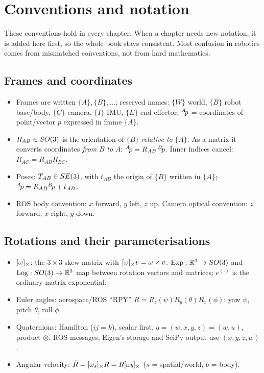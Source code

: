 \documentclass[../notes.tex]{subfiles}
\begin{document}
\chapter{Conventions and notation}

These conventions hold in every chapter. When a chapter needs new notation, it is added here first, so the whole book stays consistent. Most confusion in robotics comes from mismatched conventions, not from hard mathematics.

\section*{Frames and coordinates}
\begin{itemize}
\item Frames are written $\{A\},\{B\},\dots$; reserved names: $\{W\}$ world, $\{B\}$ robot base/body, $\{C\}$ camera, $\{I\}$ IMU, $\{E\}$ end-effector. ${}^{A}\!p$ = coordinates of point/vector $p$ expressed in frame $\{A\}$.
\item $R_{AB}\in SO(3)$ is the orientation of $\{B\}$ \emph{relative to} $\{A\}$. As a matrix it converts coordinates \emph{from} $B$ \emph{to} $A$: ${}^{A}\!p=R_{AB}\,{}^{B}\!p$. Inner indices cancel: $R_{AC}=R_{AB}R_{BC}$.
\item Poses: $T_{AB}\in SE(3)$, with $t_{AB}$ the origin of $\{B\}$ written in $\{A\}$; ${}^{A}\!p=R_{AB}{}^{B}\!p+t_{AB}$.
\item ROS body convention: $x$ forward, $y$ left, $z$ up. Camera optical convention: $z$ forward, $x$ right, $y$ down.
\end{itemize}

\section*{Rotations and their parameterisations}
\begin{itemize}
\item $[\omega]_{\times}$: the $3\times3$ skew matrix with $[\omega]_{\times}v=\omega\times v$. $\operatorname{Exp}:\mathbb{R}^3\to SO(3)$ and $\operatorname{Log}:SO(3)\to\mathbb{R}^3$ map between rotation vectors and matrices; $e^{(\cdot)}$ is the ordinary matrix exponential.
\item Euler angles: aerospace/ROS ``RPY'' $R=R_z(\psi)R_y(\theta)R_x(\phi)$: yaw $\psi$, pitch $\theta$, roll $\phi$.
\item Quaternions: Hamilton ($ij=k$), scalar first, $q=(w,x,y,z)=(w,u)$, product $\otimes$. ROS messages, Eigen's storage and SciPy output use $(x,y,z,w)$.
\item Angular velocity: $\dot R=[\omega_s]_{\times}R=R[\omega_b]_{\times}$ ($s$ = spatial/world, $b$ = body).
\end{itemize}
\end{document}
